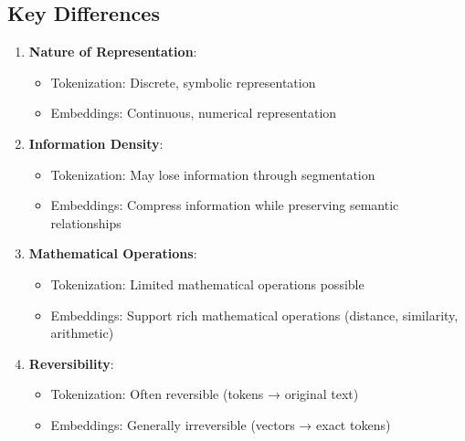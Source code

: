 \documentclass{article}
\begin{document}
\subsection{Key Differences}
\begin{enumerate}
\item \textbf{Nature of Representation}:
   \begin{itemize}
   \item Tokenization: Discrete, symbolic representation
   \item Embeddings: Continuous, numerical representation
   \end{itemize}

\item \textbf{Information Density}:
   \begin{itemize}
   \item Tokenization: May lose information through segmentation
   \item Embeddings: Compress information while preserving semantic relationships
   \end{itemize}

\item \textbf{Mathematical Operations}:
   \begin{itemize}
   \item Tokenization: Limited mathematical operations possible
   \item Embeddings: Support rich mathematical operations (distance, similarity, arithmetic)
   \end{itemize}

\item \textbf{Reversibility}:
   \begin{itemize}
   \item Tokenization: Often reversible (tokens → original text)
   \item Embeddings: Generally irreversible (vectors → exact tokens)
   \end{itemize}
\end{enumerate}
\end{document}
